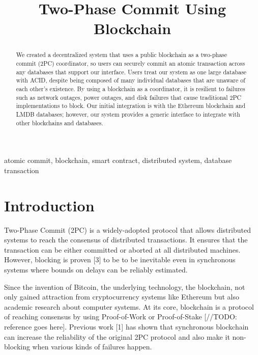 \documentclass[11pt,conference]{IEEEtran}
\begin{document}
\title{Two-Phase Commit Using Blockchain}

\author{
\and
{}
\and
{}
}

\maketitle

\begin{abstract}
We created a decentralized system that uses a public blockchain as a two-phase commit (2PC) coordinator, so users can securely commit an atomic transaction across any databases that support our interface. Users treat our system as one large database with ACID, despite being composed of many individual databases that are unaware of each other’s existence. By using a blockchain as a coordinator, it is resilient to failures such as network outages, power outages, and disk failures that cause traditional 2PC implementations to block. Our initial integration is with the Ethereum blockchain and LMDB databases; however, our system provides a generic interface to integrate with other blockchains and databases.
\end{abstract}

\begin{IEEEkeywords}
atomic commit, blockchain, smart contract, distributed system, database transaction
\end{IEEEkeywords}

\section{Introduction}
Two-Phase Commit (2PC) is a widely-adopted protocol that allows distributed systems to reach the consensus of distributed transactions. It ensures that the transaction can be either committed or aborted at all distributed machines. However, blocking is proven [3] to be to be inevitable even in
synchronous systems where bounds on delays can be reliably estimated. 

Since the invention of Bitcoin, the underlying technology, the blockchain, not only gained attraction from  cryptocurrency systems like Ethereum but also academic research about computer systems. At its core, blockchain is a protocol of reaching consensus by using Proof-of-Work or Proof-of-Stake [//TODO: reference goes here]. Previous work [1] has shown that synchronous blockchain can increase the reliability of the original 2PC protocol and also make it non-blocking when various kinds of failures happen.
\end{document}
